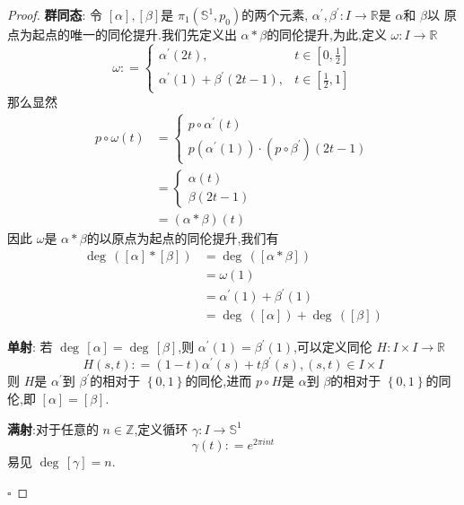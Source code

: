 \documentclass[../../几何与拓扑.tex]{subfiles}
\begin{document}
\begin{proof}

  \noindent  \textbf{群同态}: 令 \(  [\alpha ],[\beta ]  \)是 \(  \pi _1 \left( \mathbb{S}^{1},p_0 \right)   \)的两个元素, \(  \alpha ^{\prime} ,\beta ^{\prime} : I \to \mathbb{R}   \)是 \(  \alpha   \)和 \(  \beta   \)以
  原点为起点的唯一的同伦提升.我们先定义出 \(  \alpha *\beta   \)的同伦提升,为此,定义 \(   \omega : I \to \mathbb{R}   \) \[
   \omega : =  \begin{cases} \alpha ^{\prime} \left( 2t \right),& t \in [0,\frac{1}{2}]  \\ 
    \alpha ^{\prime} \left( 1 \right)+  \beta ^{\prime} \left( 2t-1 \right),& t \in [\frac{1}{2},1]  \end{cases} 
  \]那么显然 \[
  \begin{aligned}
  p\circ  \omega \left( t \right) & =  \begin{cases} p\circ \alpha ^{\prime} \left( t \right)\\ 
    p\left(  \alpha ^{\prime} \left( 1 \right)  \right)\cdot \left( p\circ\beta ^{\prime}   \right)\left( 2t-1 \right)     \end{cases}\\ 
     & =  \begin{cases} \alpha \left( t \right)\\ 
      \beta \left( 2t-1 \right)   \end{cases}\\ 
       & =  \left( \alpha *\beta  \right)\left( t \right)      
  \end{aligned}
  \]      因此 \(   \omega   \)是 \(  \alpha *\beta   \)的以原点为起点的同伦提升,我们有 \[
\begin{aligned}
    \operatorname{deg}\,\left( [\alpha ]* [\beta ] \right)&  =  \operatorname{deg}\,\left( [\alpha *\beta ] \right)\\ 
     & =    \omega \left( 1 \right)\\ 
      & =  \alpha ^{\prime} \left( 1 \right)+ \beta ^{\prime} \left( 1 \right)\\ 
       & =  \operatorname{deg}\,\left( [\alpha ] \right)+ \operatorname{deg}\,\left( [\beta ] \right)     
\end{aligned}  
  \]   

  \noindent \textbf{单射}: 若 \(  \operatorname{deg}\,[\alpha ]= \operatorname{deg}\,[\beta ]  \),则 \(  \alpha ^{\prime} \left( 1 \right)= \beta ^{\prime} \left( 1 \right)    \),可以定义同伦
  \(  H: I \times  I \to \mathbb{R}   \) \[
  H\left( s,t \right) : =  \left( 1-t \right)\alpha ^{\prime} \left( s \right)+  t\beta ^{\prime} \left( s \right),\left( s,t \right) \in I \times I     
  \]   则 \(  H  \)是 \(  \alpha ^{\prime}   \)到 \(  \beta ^{\prime}   \)的相对于 \(  \left\{ 0,1 \right\}  \)的同伦,进而 \(  p\circ H  \)是 \(  \alpha   \)到 \(  \beta   \)的相对于 \(  \left\{ 0,1 \right\}  \)的同伦,即 \(  [\alpha ]= [\beta ]  \).
  
  \noindent \textbf{满射}:对于任意的 \(  n \in \mathbb{Z}   \),定义循环 \(   \gamma : I \to \mathbb{S}^{1}  \) \[
   \gamma \left( t \right): =  e^{2\pi i nt} 
  \]  易见 \(  \operatorname{deg}\,[ \gamma ] =  n  \). 

    \hfill $\square$
\end{proof}
\end{document}
